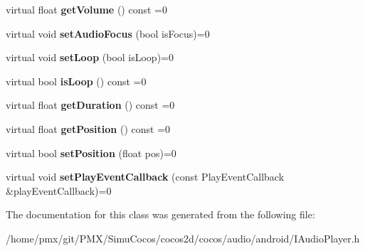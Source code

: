 \begin{DoxyCompactItemize}
virtual float {\bfseries get\+Volume} () const =0
\item 
\mbox{\label{classcocos2d_1_1experimental_1_1IAudioPlayer_a204b52ee1640fd312c2bf4e904eaa7f9}} 
virtual void {\bfseries set\+Audio\+Focus} (bool is\+Focus)=0
\item 
\mbox{\label{classcocos2d_1_1experimental_1_1IAudioPlayer_a3f7318cef627c357232a898f7a1eefb2}} 
virtual void {\bfseries set\+Loop} (bool is\+Loop)=0
\item 
\mbox{\label{classcocos2d_1_1experimental_1_1IAudioPlayer_a5422eca63c8a5294d4aa529f0d2fd640}} 
virtual bool {\bfseries is\+Loop} () const =0
\item 
\mbox{\label{classcocos2d_1_1experimental_1_1IAudioPlayer_ae4a4656ccb4168b63c7e059e496a6218}} 
virtual float {\bfseries get\+Duration} () const =0
\item 
\mbox{\label{classcocos2d_1_1experimental_1_1IAudioPlayer_af046c697e9a8ae25670952b2f6d08e07}} 
virtual float {\bfseries get\+Position} () const =0
\item 
\mbox{\label{classcocos2d_1_1experimental_1_1IAudioPlayer_acc5e6a1ea99bcddfd15f3504a0735ff6}} 
virtual bool {\bfseries set\+Position} (float pos)=0
\item 
\mbox{\label{classcocos2d_1_1experimental_1_1IAudioPlayer_a79bb5b911fae80de33291817696cb474}} 
virtual void {\bfseries set\+Play\+Event\+Callback} (const Play\+Event\+Callback \&play\+Event\+Callback)=0
\end{DoxyCompactItemize}


The documentation for this class was generated from the following file\+:\begin{DoxyCompactItemize}
\item 
/home/pmx/git/\+P\+M\+X/\+Simu\+Cocos/cocos2d/cocos/audio/android/I\+Audio\+Player.\+h\end{DoxyCompactItemize}
